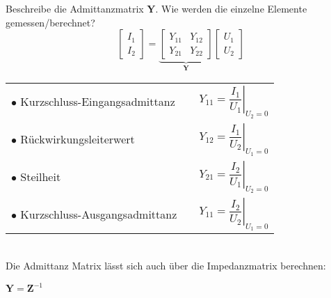 \begin{karte}{Beschreibe die Admittanzmatrix $\mathbf{Y}$. Wie werden die einzelne Elemente gemessen/berechnet?\\
		\begin{equation*}
		\left[\begin{array}{c}
		I_1 \\ I_2
		\end{array}\right]
		=
		\underbrace{\left[\begin{array}{cc}
		Y_{11} & Y_{12}\\
		Y_{21} & Y_{22}
		\end{array}\right]}_{\mathbf{Y}}
		\left[\begin{array}{c}
		U_1 \\ U_2
		\end{array}\right]
		\end{equation*}}
	\renewcommand*{\arraystretch}{2.2}
	\begin{tabular}{lcc}	
		$\bullet$ Kurzschluss-Eingangsadmittanz & \qquad & $Y_{11} = \left.\dfrac{I_1}{U_1}\right|_{U_2=0}$\\
		$\bullet$ Rückwirkungsleiterwert & \qquad & $Y_{12} = \left.\dfrac{I_1}{U_2}\right|_{U_1=0}$\\
		$\bullet$ Steilheit & \qquad & $Y_{21} = \left.\dfrac{I_2}{U_1}\right|_{U_2=0}$\\
		$\bullet$ Kurzschluss-Ausgangsadmittanz & \qquad & $Y_{11} = \left.\dfrac{I_2}{U_2}\right|_{U_1=0}$\\
	\end{tabular}\\[3pt]
	Die Admittanz Matrix lässt sich auch über die Impedanzmatrix berechnen:
	\begin{tightcenter}
		$\mathbf{Y} = \mathbf{Z}^{-1}$
	\end{tightcenter}
\end{karte}

